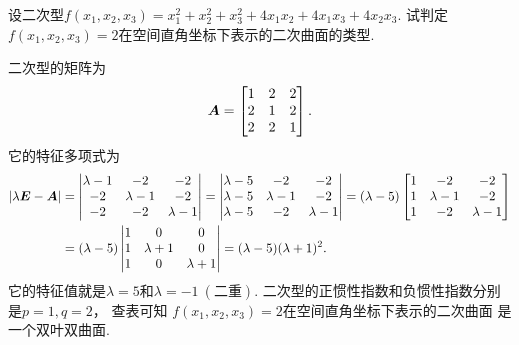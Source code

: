 \begin{example}
设二次型\(f(x_1,x_2,x_3) = x_1^2 + x_2^2 + x_3^2 + 4 x_1 x_2 + 4 x_1 x_3 + 4 x_2 x_3\).
试判定\(f(x_1,x_2,x_3) = 2\)在空间直角坐标下表示的二次曲面的类型.
\begin{solution}
二次型的矩阵为\begin{equation*}
	\boldsymbol{A} = \begin{bmatrix}
		1 & 2 & 2 \\
		2 & 1 & 2 \\
		2 & 2 & 1
	\end{bmatrix}.
\end{equation*}
它的特征多项式为\begin{align*}
	\abs{\lambda\boldsymbol{E}-\boldsymbol{A}}
	&= \begin{vmatrix}
		\lambda-1 & -2 & -2 \\
		-2 & \lambda-1 & -2 \\
		-2 & -2 & \lambda-1
	\end{vmatrix}
	= \begin{vmatrix}
		\lambda-5 & -2 & -2 \\
		\lambda-5 & \lambda-1 & -2 \\
		\lambda-5 & -2 & \lambda-1
	\end{vmatrix}
	= (\lambda-5)
	\begin{bmatrix}
		1 & -2 & -2 \\
		1 & \lambda-1 & -2 \\
		1 & -2 & \lambda-1
	\end{bmatrix} \\
	&= (\lambda-5)
	\begin{vmatrix}
		1 & 0 & 0 \\
		1 & \lambda+1 & 0 \\
		1 & 0 & \lambda+1
	\end{vmatrix}
	= (\lambda-5)(\lambda+1)^2.
\end{align*}
它的特征值就是\(\lambda=5\)和\(\lambda=-1\ (\text{二重})\).
二次型的正惯性指数和负惯性指数分别是\(p=1,q=2\)，
查表可知%
\(f(x_1,x_2,x_3) = 2\)在空间直角坐标下表示的二次曲面
是一个双叶双曲面.
\end{solution}
\end{example}

